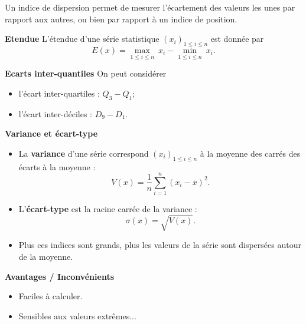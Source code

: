 \documentclass[aspectratio=169,xcolor=dvipsnames]{beamer}
\begin{document}
\begin{frame}

\textcolor{nyupurple}{\faLightbulb[regular]} Un indice de dispersion  permet de mesurer l'écartement des valeurs les unes par rapport aux autres, ou bien par rapport à un indice de position.
	
	\begin{block}{\textbf{Etendue}}
	L'étendue d'une série statistique $(x_i)_{1\leqslant i \leqslant n}$ est donnée par
		\[
		E(x) = \underset{1 \leqslant i \leqslant n}{\max} \ x_i - \underset{1 \leqslant i \leqslant n}{\min} \ x_i.
		\]
	\end{block}
	
	\begin{block}{\textbf{Ecarts inter-quantiles}}
	On peut considérer
		\begin{itemize}
		\item l'écart inter-quartiles : $Q_3-Q_1$;
		\item l'écart inter-déciles : $D_9-D_1$.
		\end{itemize}
	\end{block}
\end{frame}

\begin{frame}
	\begin{block}{\textbf{Variance et écart-type}}
		\begin{itemize}
		\item La \textbf{variance} d'une série correspond $(x_i)_{1\leqslant i \leqslant n}$ à la moyenne des carrés des écarts à la moyenne :
			\[
			V(x) = \dfrac{1}{n}\sum_{i=1}^n \left( x_i - \overline{x}\right)^2.
			\]
		\item L'\textbf{écart-type} est la racine carrée de la variance :
			\[
			\sigma(x) = \sqrt{V(x)}.
			\]
		\item Plus ces indices sont grands, plus les valeurs de la série sont dispersées autour de la moyenne.
		\end{itemize}
	\end{block}
	
	\begin{exampleblock}{\textbf{Avantages / Inconvénients}}
		\begin{itemize}
		\item[\faPlusCircle] Faciles à calculer.
		\item[\faMinusCircle] Sensibles aux valeurs extrêmes...
		\end{itemize}
	\end{exampleblock}
\end{frame}
\end{document}
